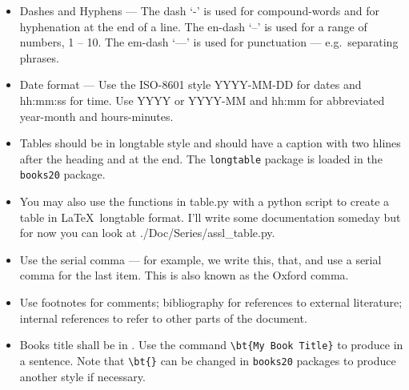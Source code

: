 
\begin{itemize}

\item Dashes and Hyphens --- The dash `-' is used for compound-words and for
  hyphenation at the end of a line.  The en-dash `--' is used for a range
  of numbers, 1 -- 10. The em-dash `---' is used for punctuation ---
  e.g.\ separating phrases.

\item Date format --- Use the ISO-8601 \cite{isotime} style
  YYYY-MM-DD for dates and hh:mm:ss for time. Use YYYY or YYYY-MM
  and hh:mm for abbreviated year-month and hours-minutes.

\item Tables should be in longtable style and should have a caption
  with two hlines after the heading and at the end. The
  \texttt{longtable} \cite{Carlisle2014} package is loaded in the \texttt{books20}
  package.

\item You may also use the functions in table.py with a python script to create
  a table in \LaTeX\ longtable format.  I'll write some documentation someday
  but for now you can look at ./Doc/Series/assl\_table.py.

\item Use the serial comma --- for example, we write this, that, and
  use a serial comma for the last item. This is also known as the Oxford
  comma.

\item Use footnotes for comments; bibliography for references to
  external literature; internal references to refer to other parts of
  the document.

\item Books title shall be in . Use the command
  \verb|\bt{My Book Title}| to produce  in a
  sentence. Note that \verb|\bt{}| can be changed in \texttt{books20}
  packages to produce another style if necessary.

\end{itemize}


